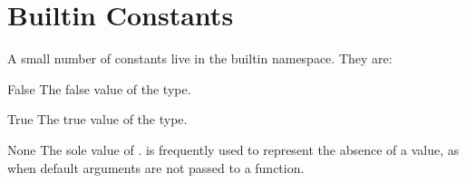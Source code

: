 \section{Builtin Constants}

A small number of constants live in the builtin namespace.  They are:

\begin{datadesc}{False}
The false value of the  type.
\end{datadesc}

\begin{datadesc}{True}
The true value of the  type.
\end{datadesc}

\begin{datadesc}{None}
The sole value of .   is frequently used to
represent the absence of a value, as when default arguments are not passed
to a function.
\end{datadesc}


